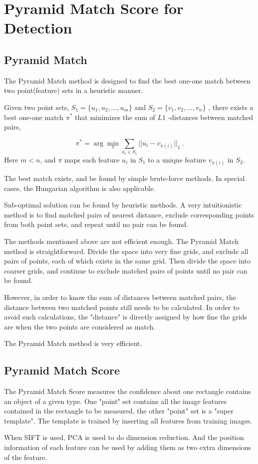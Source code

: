 \chapter{Pyramid Match Score for Detection}
\label{chp5}

\section{Pyramid Match}

The Pyramid Match method is designed to find the best one-one match between two point(feature) sets in a heuristic manner.

Given two point sets, ${S_1} = \{ {u_1},{u_2},...,{u_m}\} $
 and ${S_2} = \{ {v_1},{v_2},...,{v_n}\} $
, there exists a best one-one match ${\pi}^*$ that minimizes the sum of $L1$
-distances between matched pairs,

\[
{\pi ^*} = \arg \mathop {\min }\limits_\pi  \sum\limits_{{u_i} \in {S_1}} {||{u_i} - {v_{\pi (i)}}|{|_1}} \ .
\]
Here $m<n$, and $\pi$ maps each feature $u_i$ in $S_1$ to a unique feature ${{v_{\pi (i)}}}
$ in $S_2$.

The best match exists, and be found by simple brute-force methods. In special cases, the Hungarian algorithm is also applicable.

Sub-optimal solution can be found by heuristic methods. A very intuitionistic method is to find matched pairs of nearest distance, exclude corresponding points from both point sets, and repeat until no pair can be found.

The methods mentioned above are not efficient enough. The Pyramid Match method is straightforward. Divide the space into very fine grids, and exclude all pairs of points, each of which exists in the same grid. Then divide the space into coarser grids, and continue to exclude matched pairs of points until no pair can be found.

However, in order to know the sum of distances between matched pairs, the distance between two matched points still needs to be calculated. In order to avoid such calculations, the "distance" is directly assigned by how fine the grids are when the two points are considered as match.

The Pyramid Match method is very efficient.

\section{Pyramid Match Score}

The Pyramid Match Score measures the confidence about one rectangle contains an object of a given type. One "point" set contains all the image features contained in the rectangle to be measured, the other "point" set is a "super template". The template is trained by inserting all features from training images.

When SIFT is used, PCA is used to do dimension reduction. And the position information of each feature can be used by adding them as two extra dimensions of the feature.
